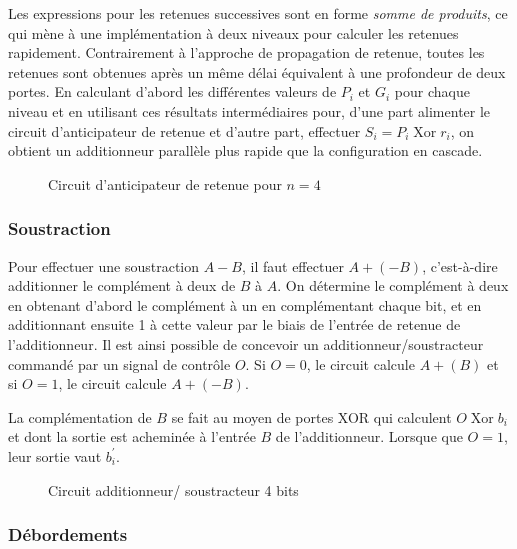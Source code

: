 \documentclass[11pt]{article}
\begin{document}
Les expressions pour les retenues successives sont en forme \emph{somme de
produits}, ce qui mène à une implémentation à deux niveaux pour
calculer les retenues rapidement. Contrairement à l'approche de
propagation de retenue, toutes les retenues sont obtenues après un
même délai équivalent à une profondeur de deux portes.  En calculant
d'abord les différentes valeurs de \(P_i\) et \(G_i\) pour chaque
niveau et en utilisant ces résultats intermédiaires pour, d'une part
alimenter le circuit d'anticipateur de retenue et d'autre part,
effectuer \(S_i = P_i  \operatorname{Xor} r_i\), on obtient un additionneur parallèle
plus rapide que la configuration en cascade.

\begin{figure}[htbp]
\centering

\caption{\label{fig:org56b61fa}Circuit d'anticipateur de retenue pour \(n= 4\)}
\end{figure}


\subsubsection{Soustraction}
\label{sec:orgd39e539}

Pour effectuer une soustraction \(A - B\), il faut effectuer \(A +
(-B)\), c’est-à-dire additionner le complément à deux de \(B\) à
\(A\). On détermine le complément à deux en obtenant d'abord le
complément à un en complémentant chaque bit, et en additionnant ensuite
1 à cette valeur par le biais de l'entrée de retenue de l'additionneur. Il
est ainsi possible de concevoir un additionneur/soustracteur commandé
par un signal de contrôle \(O\). Si \(O=0\), le circuit calcule \(A +
(B)\) et si \(O=1\), le circuit calcule \(A + (-B)\).

La complémentation de \(B\) se fait au moyen de portes XOR qui
calculent \(O  \operatorname{Xor} b_i\) et dont la sortie est acheminée à l'entrée
\(B\) de l'additionneur. Lorsque que \(O=1\), leur sortie vaut
\(b_i^\prime\).

\begin{figure}[htbp]
\centering

\caption{\label{fig:orgf1b16d4}Circuit additionneur/ soustracteur 4 bits}
\end{figure}

\subsubsection{Débordements}
\label{sec:org1620ff8}
\end{document}
